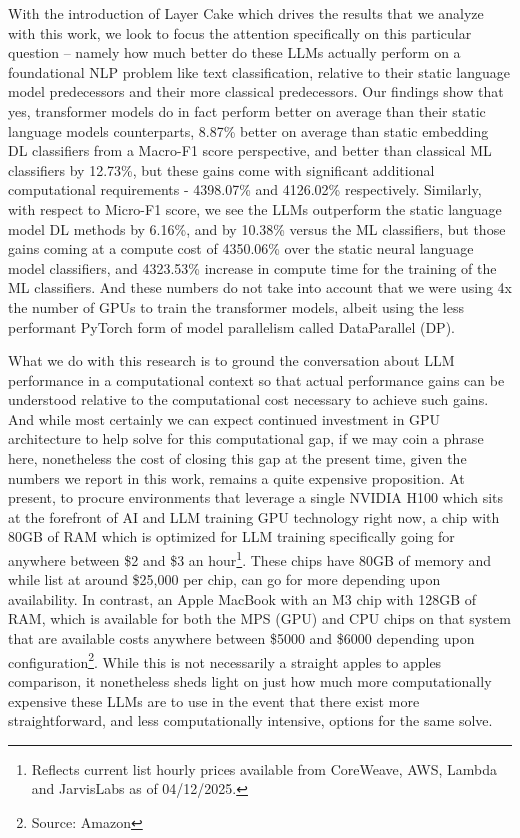 \documentclass[final]{clv2025}
\begin{document}
With the introduction of Layer Cake which drives the results that we analyze with this work, we look to focus the attention specifically on this particular question – namely how much better do these LLMs actually perform on a foundational NLP problem like text classification, relative to their static language model predecessors and their more classical predecessors. Our findings show that yes, transformer models do in fact perform better on average than their static language models counterparts, 8.87\% better on average than static embedding DL classifiers from a Macro-F1 score perspective, and better than classical ML classifiers by 12.73\%, but these gains come with significant additional computational requirements - 4398.07\% and 4126.02\% respectively. Similarly, with respect to Micro-F1 score, we see the LLMs outperform the static language model DL methods by 6.16\%, and by 10.38\% versus the ML classifiers, but those gains coming at a compute cost of 4350.06\% over the static neural language model classifiers, and 4323.53\% increase in compute time for the training of the ML classifiers. And these numbers do not take into account that we were using 4x the number of GPUs to train the transformer models, albeit using the less performant PyTorch form of model parallelism called DataParallel (DP).

What we do with this research is to ground the conversation about LLM performance in a computational context so that actual performance gains can be understood relative to the computational cost necessary to achieve such gains. And while most certainly we can expect continued investment in GPU architecture to help solve for this computational gap, if we may coin a phrase here, nonetheless the cost of closing this gap at the present time, given the numbers we report in this work, remains a quite expensive proposition. At present, to procure environments that leverage a single NVIDIA H100 which sits at the forefront of AI and LLM training GPU technology right now, a chip with 80GB of RAM which is optimized for LLM training specifically going for anywhere between \$2 and \$3 an hour\footnote{  Reflects current list hourly prices available from CoreWeave, AWS, Lambda and JarvisLabs as of 04/12/2025. }.  These chips have 80GB of memory and while list at around \$25,000 per chip, can go for more depending upon availability. In contrast, an Apple MacBook with an M3 chip with 128GB of RAM, which is available for both the MPS (GPU) and CPU chips on that system that are available costs anywhere between \$5000 and \$6000 depending upon configuration\footnote{Source: Amazon}. While this is not necessarily a straight apples to apples comparison, it nonetheless sheds light on just how much more computationally expensive these LLMs are to use in the event that there exist more straightforward, and less computationally intensive, options for the same solve.
\end{document}
